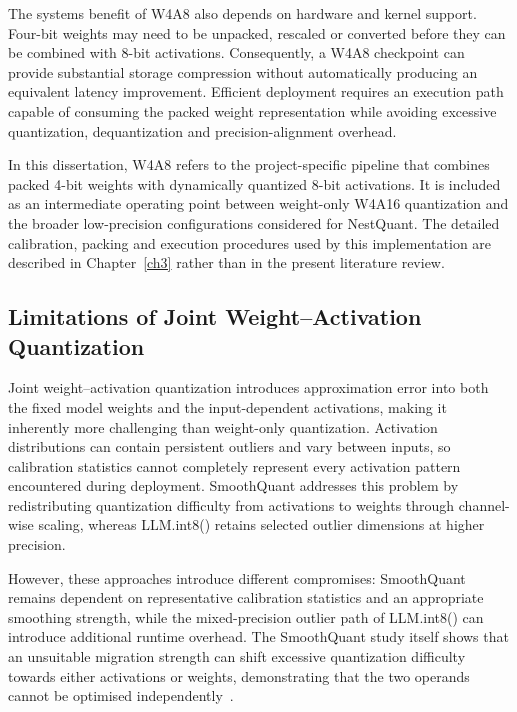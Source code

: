 The systems benefit of W4A8 also depends on hardware and kernel support.
Four-bit weights may need to be unpacked, rescaled or converted before
they can be combined with 8-bit activations. Consequently, a W4A8
checkpoint can provide substantial storage compression without
automatically producing an equivalent latency improvement. Efficient
deployment requires an execution path capable of consuming the packed
weight representation while avoiding excessive quantization,
dequantization and precision-alignment overhead.

In this dissertation, W4A8 refers to the project-specific pipeline that
combines packed 4-bit weights with dynamically quantized 8-bit
activations. It is included as an intermediate operating point between
weight-only W4A16 quantization and the broader low-precision
configurations considered for NestQuant. The detailed calibration,
packing and execution procedures used by this implementation are
described in Chapter~\ref{ch3} rather than in the present literature review.

\subsection{Limitations of Joint Weight--Activation Quantization}
Joint weight--activation quantization introduces approximation error
into both the fixed model weights and the input-dependent activations,
making it inherently more challenging than weight-only quantization\cite{shao2024omniquantomnidirectionallycalibratedquantization}.
Activation distributions can contain persistent outliers and vary
between inputs, so calibration statistics cannot completely represent
every activation pattern encountered during deployment. SmoothQuant
addresses this problem by redistributing quantization difficulty from
activations to weights through channel-wise scaling, whereas
LLM.int8() retains selected outlier dimensions at higher precision\cite{dettmers2022llmint88bitmatrixmultiplication}.

However, these approaches introduce different compromises:
SmoothQuant remains dependent on representative calibration statistics
and an appropriate smoothing strength, while the mixed-precision
outlier path of LLM.int8() can introduce additional runtime overhead.
The SmoothQuant study itself shows that an unsuitable migration strength
can shift excessive quantization difficulty towards either activations
or weights, demonstrating that the two operands cannot be optimised
independently~\cite{xiao2023icml-smoothquant}.

